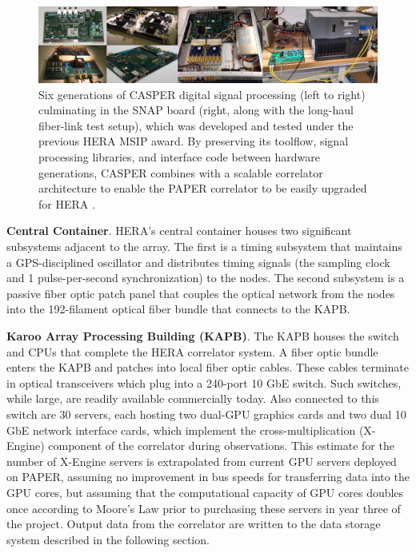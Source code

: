 \documentclass[preprint,11pt]{aastex}
\newcommand{\Mycitep}[1]{\citep{#1}}
\begin{document}
\begin{figure}[h]
\centering
\includegraphics[width=1.0\textwidth]{plots/casper_boards.png}
\caption{
Six generations of CASPER digital signal processing (left to right) culminating in the SNAP board (right, along with the long-haul fiber-link test setup), which was developed and tested under the previous HERA MSIP award.
By preserving its toolflow, signal processing libraries, and interface code between hardware generations,
CASPER combines with a scalable correlator architecture to enable the PAPER correlator to be 
easily upgraded for HERA \Mycitep{parsons_et_al2006,parsons_et_al2008}.
%
}\label{fig:hardware}
\end{figure}

{\bf Central Container}.
HERA's central container houses two significant subsystems adjacent to the array.  The first is a timing subsystem
that maintains a GPS-disciplined oscillator and distributes timing
signals (the sampling clock and 1 pulse-per-second synchronization) to the nodes.  The second
subsystem is a passive fiber optic patch panel that couples
the optical network from the nodes into the 192-filament optical fiber bundle 
that connects to the KAPB. 

{\bf Karoo Array Processing Building (KAPB)}.
The KAPB houses the switch and CPUs
that 
complete the HERA correlator system.  A fiber optic bundle enters the KAPB and patches
into local fiber optic cables. These cables terminate in optical transceivers which plug into a 240-port 10 GbE switch.
Such switches, while large, are readily available commercially today.  Also connected to
this switch are 30 servers, each hosting two dual-GPU graphics cards and two dual
10 GbE network interface cards, which implement the cross-multiplication (X-Engine) component
of the correlator during observations.  This estimate for the number of X-Engine servers
is extrapolated from current GPU servers deployed on PAPER, assuming no improvement in bus
speeds for transferring data into the GPU cores, but assuming that the computational
capacity of GPU cores doubles once according to Moore's Law prior to purchasing
these servers in year three of the project.
Output data from the correlator are written to the data storage system described
in the following section.
\end{document}
